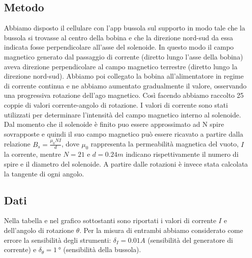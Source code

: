 \documentclass[a4paper]{article}
\begin{document}
\subsection{Metodo}
Abbiamo disposto il cellulare con l’app bussola sul supporto in modo tale che la bussola si trovasse al centro della bobina e che la direzione nord-sud da essa indicata
fosse perpendicolare all'asse del solenoide. In questo modo il campo magnetico generato dal passaggio di corrente (diretto lungo l'asse della bobina) aveva direzione perpendicolare
al campo magnetico terrestre (diretto lungo la direzione nord-sud). Abbiamo poi collegato la bobina all’alimentatore in regime di corrente continua e ne abbiamo aumentato gradualmente il valore,
osservando una progressiva rotazione dell'ago magnetico. Così facendo abbiamo raccolto 25 coppie di valori corrente-angolo di rotazione.
I valori di corrente sono stati utilizzati per determinare l'intensità del campo magnetico interno al solenoide. Dal momento che il solenoide è finito puo essere approssimato ad N spire sovrapposte e quindi
il suo campo magnetico può essere ricavato a partire dalla relazione \( B_s = \frac {\mu_0NI}{d} \),
dove \(\mu_0\) rappresenta la permeabilità magnetica del vuoto, \( \mathit{I} \) la corrente,
mentre \( \mathit{N=21} \) e \( \mathit{d=0.24m} \) indicano rispettivamente il numero di spire e il diametro del solenoide.
A partire dalle rotazioni è invece stata calcolata la tangente di ogni angolo.
\subsection{Dati}
Nella tabella e nel grafico sottostanti sono riportati i valori di corrente $I$ e dell'angolo di rotazione $\theta$.
Per la misura di entrambi abbiamo considerato come errore la sensibilità degli strumenti:
$\delta_I=0.01A$ (sensibilità del generatore di corrente) e $\delta_\theta=\SI{1}{\degree}$ (sensibilità della bussola).
\end{document}
